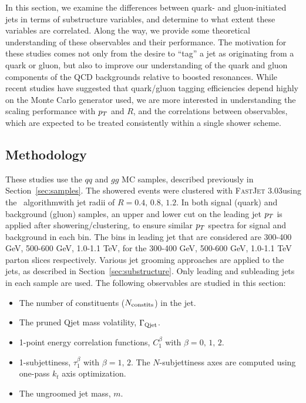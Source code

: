 In this section, we examine the differences between quark- and
gluon-initiated jets in terms of substructure variables, and determine to what extent these variables are correlated. Along the
way, we provide some theoretical understanding of these
observables and their performance. The motivation for these studies
 comes not only from the
desire to ``tag'' a jet as originating from a quark or gluon, but also
to improve our  understanding of the quark and gluon components of the
QCD backgrounds relative to boosted resonances.  While recent studies
have suggested that quark/gluon tagging efficiencies depend highly on
the Monte Carlo generator used, we are more interested in
understanding the scaling performance with $p_T$ and $R$, and the
correlations between observables, which are expected to be treated
consistently within a single shower scheme.

\subsection{Methodology}

These studies use the $qq$ and $gg$ MC samples, described previously in Section~\ref{sec:samples}. 
The showered events were clustered with \textsc{FastJet}
3.03 using
the \antikt~algorithm with jet radii of $R = 0.4,\, 0.8,\, 1.2$. In
both signal (quark) and background (gluon) samples, an upper and lower cut on
the leading jet $p_T$ is applied after showering/clustering, to ensure
similar $p_T$ spectra for signal and background in each \pt bin. The bins
in leading jet \pt that are considered are 300-400 GeV, 500-600 GeV,
1.0-1.1 TeV, for the 300-400 GeV, 500-600 GeV,
1.0-1.1 TeV parton \pt slices respectively. 
Various jet grooming approaches are applied to the jets, as described in Section~\ref{sec:substructure}. 
Only leading and subleading jets in each sample are used. The
following observables are studied in this section:

\begin{itemize}
\item The number of constituents ($N_{\rm constits}$) in the jet.
\item The pruned Qjet mass volatility, $\Gamma_{\rm Qjet}$.
\item 1-point energy correlation functions, $C_1^{\beta}$ with $\beta=0,\,1,\,2$.
\item 1-subjettiness, $\tau_1^{\beta}$ with $\beta=1,\,2$. The $N$-subjettiness axes are computed using one-pass $k_t$ axis optimization.
\item The ungroomed jet mass,  $m$.
\end{itemize}

